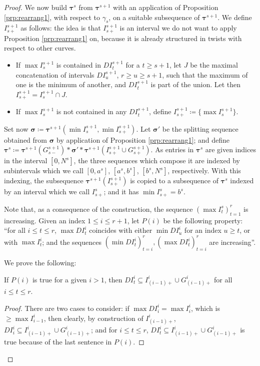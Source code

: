 \begin{proof}
We now build $\bm\tau^s$ from $\bm\tau^{s+1}$ with an application of Proposition \ref{prp:rearrang1}, with respect to $\gamma_s$, on a suitable subsequence of $\bm\tau^{s+1}$. We define $I^{s+1}_{s+}$ as follows: the idea is that $I^{s+1}_{s+}$ is an interval we do not want to apply Proposition \ref{prp:rearrang1} on, because it is already structured in twists with respect to other curves.
\begin{itemize}
\item If $\max I^{s+1}_s$ is contained in $DI^{s+1}_t$ for a $t\geq s+1$, let $J$ be the maximal concatenation of intervals $DI^{s+1}_u$, $r\geq u \geq s+1$, such that the maximum of one is the minimum of another, and $DI^{s+1}_t$ is part of the union. Let then $I^{s+1}_{s+}= I^{s+1}_s\cap J$.
\item If $\max I^{s+1}_s$ is not contained in any $DI^{s+1}_t$, define $I^{s+1}_{s+}\coloneqq \{\max I^{s+1}_s\}$.
\end{itemize}

Set now $\bm\sigma\coloneqq\bm\tau^{s+1}(\min I^{s+1}_s,\min I^{s+1}_{s+})$. Let $\bm\sigma'$ be the splitting sequence obtained from $\bm\sigma$ by application of Proposition \ref{prp:rearrang1}; and define $\bm\tau^s\coloneqq \bm\tau^{s+1}(G^{s+1}_{s-})*\bm\sigma'*\bm\tau^{s+1}(I^{s+1}_{s+}\cup G^{s+1}_{s+})$. As entries in $\bm\tau^s$ are given indices in the interval $[0,N^s]$, the three sequences which compose it are indexed by subintervals which we call $[0,a^s]$, $[a^s,b^s]$, $[b^s,N^s]$, respectively. With this indexing, the subsequence $\bm\tau^{s+1}(I^{s+1}_{s+})$ is copied to a subsequence of $\bm\tau^s$ indexed by an interval which we call $I^s_{s+}$; and it has $\min I^s_{s+}=b^s$.

Note that, as a consequence of the construction, the sequence $(\max I^s_t)_{t=1}^r$ is increasing. Given an index $1\leq i\leq r+1$, let $P(i)$ be the following property: ``for all $i \leq t \leq r$, $\max DI^i_t$ coincides with either $\min DI^i_{u}$ for an index $u\geq t$, or with $\max I^i_t$; and the sequences $(\min DI^i_t)_{t=i}^r, (\max DI^i_t)_{t=i}^r$ are increasing''.

We prove the following: 
\begin{claim}
If $P(i)$ is true for a given $i> 1$, then $DI^i_t\subseteq I^i_{(i-1)+}\cup G^i_{(i-1)+}$ for all $i\leq t\leq r$.
\end{claim}
\begin{proof}
There are two cases to consider: if $\max DI^i_i=\max I^i_i$, which is $\geq \max I^i_{i-1}$, then clearly, by construction of $I^i_{(i-1)+}$, $DI^{i}_i\subseteq I^{i}_{(i-1)+}\cup G^{i}_{(i-1)+}$; and for $i \leq t \leq r$, $DI^{i}_t\subseteq I^{i}_{(i-1)+}\cup G^{i}_{(i-1)+}$ is true because of the last sentence in $P(i)$.


\end{proof}
\end{proof}
